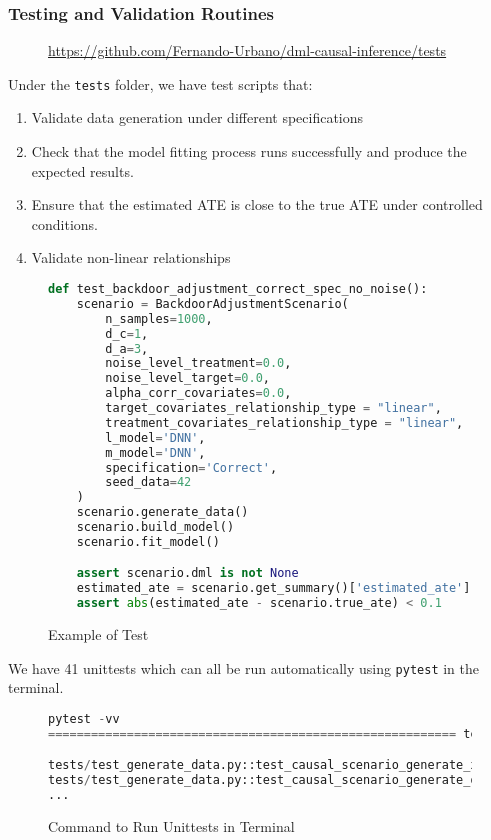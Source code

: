 \documentclass{article}
\numberwithin{equation}{section}
\begin{document}
\subsubsection{Testing and Validation Routines}

\begin{figure}[H]
    \centering
    \url{https://github.com/Fernando-Urbano/dml-causal-inference/tests}
\end{figure}

Under the \texttt{tests} folder, we have test scripts that:

\begin{enumerate}[label=\roman*.]
    \item Validate data generation under different specifications
    \item Check that the model fitting process runs successfully and produce the expected results.
    \item Ensure that the estimated ATE is close to the true ATE under controlled conditions.
    \item Validate non-linear relationships
\end{enumerate}

\begin{figure}[H]
\begin{lstlisting}[language=python]
def test_backdoor_adjustment_correct_spec_no_noise():
    scenario = BackdoorAdjustmentScenario(
        n_samples=1000,
        d_c=1,
        d_a=3,
        noise_level_treatment=0.0,
        noise_level_target=0.0,
        alpha_corr_covariates=0.0,
        target_covariates_relationship_type = "linear",
        treatment_covariates_relationship_type = "linear",
        l_model='DNN',
        m_model='DNN',
        specification='Correct',
        seed_data=42
    )
    scenario.generate_data()
    scenario.build_model()
    scenario.fit_model()

    assert scenario.dml is not None
    estimated_ate = scenario.get_summary()['estimated_ate'].iloc[0]
    assert abs(estimated_ate - scenario.true_ate) < 0.1
\end{lstlisting}
\caption{Example of Test}
\end{figure}

We have 41 unittests which can all be run automatically using \texttt{pytest} in the terminal.

\begin{figure}[H]
\begin{lstlisting}[language=python]
pytest -vv
========================================================= test session starts ==========================================================

tests/test_generate_data.py::test_causal_scenario_generate_x PASSED                                                               [  2%]
tests/test_generate_data.py::test_causal_scenario_generate_data PASSED                                                            [  5%]
...
\end{lstlisting}
\caption{Command to Run Unittests in Terminal}
\end{figure}
\end{document}
